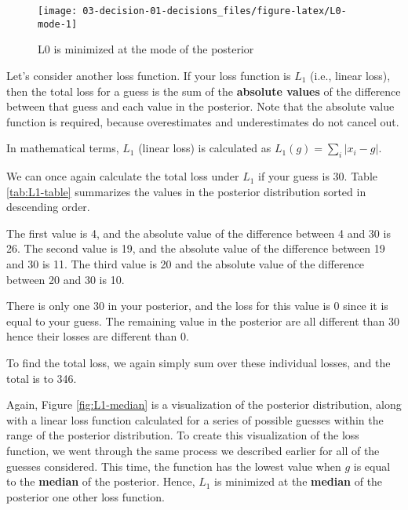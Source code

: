 \documentclass[]{book}
\theoremstyle{definition}
\theoremstyle{definition}
\theoremstyle{definition}
\theoremstyle{remark}
\begin{document}
\begin{figure}

{\centering \texttt{[image: 03-decision-01-decisions\_files/figure-latex/L0-mode-1]} 

}

\caption{L0 is minimized at the mode of the posterior}\label{fig:L0-mode}
\end{figure}

Let's consider another loss function. If your loss function is \(L_1\)
(i.e., linear loss), then the total loss for a guess is the sum of the
\textbf{absolute values} of the difference between that guess and each
value in the posterior. Note that the absolute value function is
required, because overestimates and underestimates do not cancel out.

In mathematical terms, \(L_1\) (linear loss) is calculated as
\(L_1(g) = \sum_i |x_i - g|\).

We can once again calculate the total loss under \(L_1\) if your guess
is 30. Table \ref{tab:L1-table} summarizes the values in the posterior
distribution sorted in descending order.

The first value is 4, and the absolute value of the difference between 4
and 30 is 26. The second value is 19, and the absolute value of the
difference between 19 and 30 is 11. The third value is 20 and the
absolute value of the difference between 20 and 30 is 10.

There is only one 30 in your posterior, and the loss for this value is 0
since it is equal to your guess. The remaining value in the posterior
are all different than 30 hence their losses are different than 0.

To find the total loss, we again simply sum over these individual
losses, and the total is to 346.

Again, Figure \ref{fig:L1-median} is a visualization of the posterior
distribution, along with a linear loss function calculated for a series
of possible guesses within the range of the posterior distribution. To
create this visualization of the loss function, we went through the same
process we described earlier for all of the guesses considered. This
time, the function has the lowest value when \(g\) is equal to the
\textbf{median} of the posterior. Hence, \(L_1\) is minimized at the
\textbf{median} of the posterior one other loss function.
\end{document}
